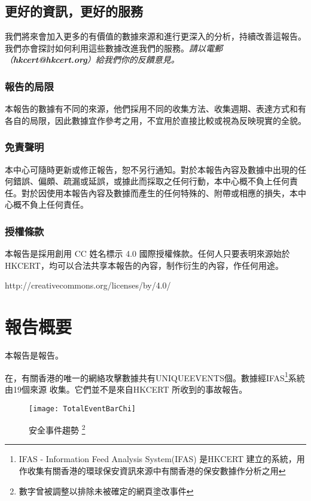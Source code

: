 \documentclass[14pt]{extarticle}
\begin{document}
\subsection*{更好的資訊，更好的服務}

我們將來會加入更多的有價值的數據來源和進行更深入的分析，持續改善這報告。我們亦會探討如何利用這些數據改進我們的服務。\textit{請以電郵（\textbf{hkcert@hkcert.org}）給我們你的反饋意見。}

\subsubsection*{報告的局限}

本報告的數據有不同的來源，他們採用不同的收集方法、收集週期、表達方式和有各自的局限，因此數據宜作參考之用，不宜用於直接比較或視為反映現實的全貌。

\subsubsection*{免責聲明}
本中心可隨時更新或修正報告，恕不另行通知。對於本報告內容及數據中出現的任何錯誤、偏頗、疏漏或延誤，或據此而採取之任何行動，本中心概不負上任何責任。對於因使用本報告內容及數據而產生的任何特殊的、附帶或相應的損失，本中心概不負上任何責任。

\subsubsection*{授權條款}
本報告是採用創用 CC 姓名標示 4.0 國際授權條款。任何人只要表明來源始於HKCERT，均可以合法共享本報告的內容，制作衍生的內容，作任何用途。

http://creativecommons.org/licenses/by/4.0/

\clearpage
\tableofcontents
\clearpage

\section*{報告概要}
本報告是報告。

在，有關香港的唯一的網絡攻擊數據共有UNIQUEEVENTS個。數據經IFAS\footnote{IFAS - Information Feed Analysis System(IFAS) 是HKCERT 建立的系統，用作收集有關香港的環球保安資訊來源中有關香港的保安數據作分析之用}系統由19個來源 收集。它們並不是來自HKCERT 所收到的事故報告。

\begin{figure}[h!]
\centerline{\texttt{[image: TotalEventBarChi]}}
\caption{安全事件趨勢
{\protect\footnote{數字曾被調整以排除未被確定的網頁塗改事件}}}
\end{figure}
\end{document}
